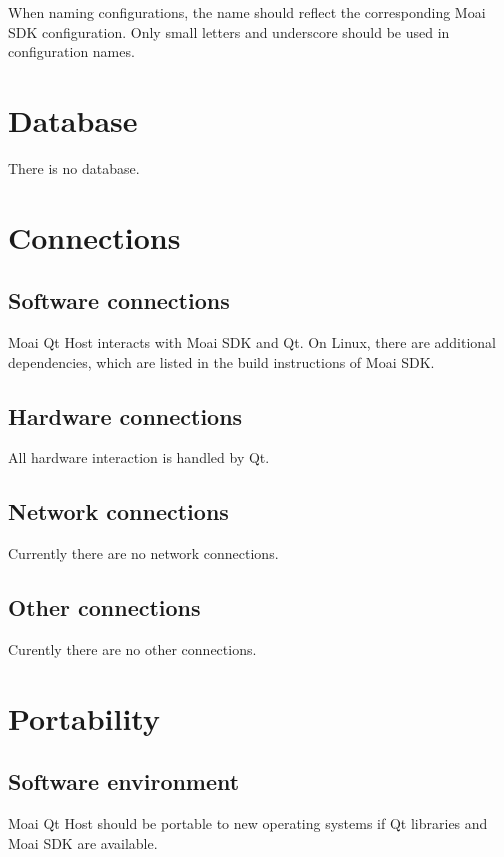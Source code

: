 When naming configurations, the name should reflect the corresponding Moai SDK configuration. Only small letters and underscore should be used in configuration names.

\section{Database}

There is no database.

\section{Connections}

\subsection{Software connections}

Moai Qt Host interacts with Moai SDK and Qt.
On Linux, there are additional dependencies, which are listed in the build instructions of Moai SDK.

\subsection{Hardware connections}

All hardware interaction is handled by Qt.

\subsection{Network connections}

Currently there are no network connections.

\subsection{Other connections}

Curently there are no other connections.

\section{Portability}

\subsection{Software environment}

Moai Qt Host should be portable to new operating systems if Qt libraries and Moai SDK are available.

